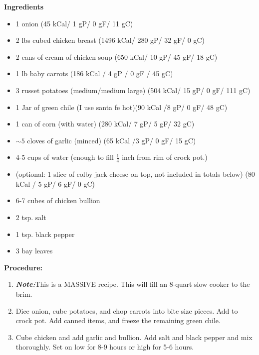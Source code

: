 \begin{multicols}{2}
\textbf{Ingredients}
\begin{itemize}
\item 1 onion \quad (45 kCal/ 1 gP/ 0 gF/ 11 gC)
\item 2 lbs cubed chicken breast \newline(1496 kCal/ 280 gP/  32 gF/ 0 gC)
\item 2 cans of cream of chicken soup  \quad (650 kCal/ 10 gP/ 45 gF/ 18 gC)
\item 1 lb baby carrots \quad (186 kCal / 4 gP / 0 gF / 45 gC)
\item 3 russet potatoes (medium/medium large) \quad (504 kCal/ 15 gP/ 0 gF/ 111 gC)
\item 1 Jar of green chile (I use santa fe hot)\newline  (90 kCal /8 gP/ 0 gF/ 48 gC)
\item 1 can of corn (with water) \quad (280 kCal/ 7 gP/ 5 gF/ 32 gC)
\item $\sim 5$ cloves of garlic (minced) (65 kCal /3 gP/ 0 gF/ 15 gC) 
\item 4-5 cups of water (enough to fill $\frac{1}{4}$ inch from rim of crock pot.)
\item (optional: 1 slice of colby jack cheese on top, not included in totals below) \newline (80 kCal / 5 gP/ 6 gF/ 0 gC)
\item 6-7 cubes of chicken bullion 
\item 2 tsp. salt
\item 1 tsp. black pepper
\item 3 bay leaves



\end{itemize}


\columnbreak
\textbf{Procedure:}
\medskip


\begin{enumerate}
\item \textbf{\textit{Note:}}This is a MASSIVE recipe. This will fill an 8-quart slow cooker to the brim. 
\item Dice onion, cube potatoes, and chop carrots into bite size pieces. Add to crock pot. Add canned items, and freeze the remaining green chile.  


\medskip
\item Cube chicken and add garlic and bullion. Add salt and black pepper and mix thoroughly. Set on low for 8-9 hours or high for 5-6 hours. 
  

\end{enumerate}
\end{multicols}
